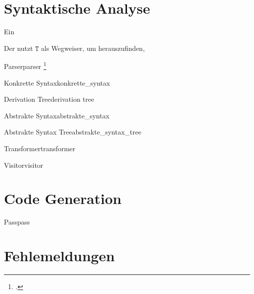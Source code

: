 \section{Syntaktische Analyse}

Ein

Der  nutzt  $\mathtt{T}$ als Wegweiser, um herauszufinden,


\begin{Definition}{Parser}{parser}
\footcite{noauthor_what_nodate}
\end{Definition}

\begin{Definition}{Konkrette Syntax}{konkrette_syntax}
\end{Definition}

\begin{Definition}{Derivation Tree}{derivation tree}
\end{Definition}

\begin{Definition}{Abstrakte Syntax}{abstrakte_syntax}
\end{Definition}

\begin{Definition}{Abstrakte Syntax Tree}{abstrakte_syntax_tree}
\end{Definition}

\begin{Definition}{Transformer}{transformer}
\end{Definition}

\begin{Definition}{Visitor}{visitor}
\end{Definition}

\section{Code Generation}
\begin{Definition}{Pass}{pass}
\end{Definition}
\section{Fehlemeldungen}
